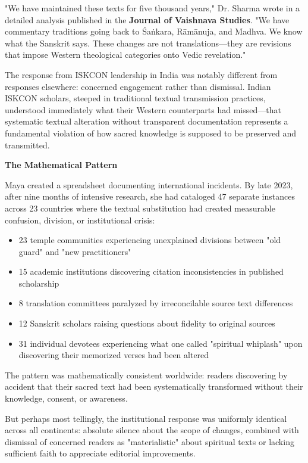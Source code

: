 \documentclass[12pt,twoside]{book}
\begin{document}
"We have maintained these texts for five thousand years," Dr. Sharma wrote in a detailed analysis published in the \textbf{Journal of Vaishnava Studies}. "We have commentary traditions going back to Śaṅkara, Rāmānuja, and Madhva. We know what the Sanskrit says. These changes are not translations—they are revisions that impose Western theological categories onto Vedic revelation."

The response from ISKCON leadership in India was notably different from responses elsewhere: concerned engagement rather than dismissal. Indian ISKCON scholars, steeped in traditional textual transmission practices, understood immediately what their Western counterparts had missed—that systematic textual alteration without transparent documentation represents a fundamental violation of how sacred knowledge is supposed to be preserved and transmitted.

\textbf{\textbf{The Mathematical Pattern}}

Maya created a spreadsheet documenting international incidents. By late 2023, after nine months of intensive research, she had cataloged 47 separate instances across 23 countries where the textual substitution had created measurable confusion, division, or institutional crisis:

\begin{itemize}
\item 23 temple communities experiencing unexplained divisions between "old guard" and "new practitioners"
\item 15 academic institutions discovering citation inconsistencies in published scholarship
\item 8 translation committees paralyzed by irreconcilable source text differences
\item 12 Sanskrit scholars raising questions about fidelity to original sources
\item 31 individual devotees experiencing what one called "spiritual whiplash" upon discovering their memorized verses had been altered
\end{itemize}

The pattern was mathematically consistent worldwide: readers discovering by accident that their sacred text had been systematically transformed without their knowledge, consent, or awareness.

But perhaps most tellingly, the institutional response was uniformly identical across all continents: absolute silence about the scope of changes, combined with dismissal of concerned readers as "materialistic" about spiritual texts or lacking sufficient faith to appreciate editorial improvements.
\end{document}
